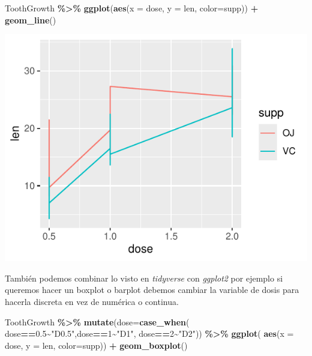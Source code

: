 \documentclass[
]{book}
\newenvironment{Shaded}{\begin{snugshade}}{\end{snugshade}}
\newcommand{\AttributeTok}[1]{\textcolor[rgb]{0.13,0.29,0.53}{#1}}
\newcommand{\DecValTok}[1]{\textcolor[rgb]{0.00,0.00,0.81}{#1}}
\newcommand{\FloatTok}[1]{\textcolor[rgb]{0.00,0.00,0.81}{#1}}
\newcommand{\FunctionTok}[1]{\textcolor[rgb]{0.13,0.29,0.53}{\textbf{#1}}}
\newcommand{\NormalTok}[1]{#1}
\newcommand{\SpecialCharTok}[1]{\textcolor[rgb]{0.81,0.36,0.00}{\textbf{#1}}}
\newcommand{\StringTok}[1]{\textcolor[rgb]{0.31,0.60,0.02}{#1}}
\begin{document}
\begin{Shaded}
\begin{Highlighting}[]
\NormalTok{ToothGrowth }\SpecialCharTok{\%\textgreater{}\%} \FunctionTok{ggplot}\NormalTok{(}\FunctionTok{aes}\NormalTok{(}\AttributeTok{x =}\NormalTok{ dose, }\AttributeTok{y =}\NormalTok{ len, }\AttributeTok{color=}\NormalTok{supp)) }\SpecialCharTok{+}
  \FunctionTok{geom\_line}\NormalTok{()}
\end{Highlighting}
\end{Shaded}

\begin{center}\includegraphics{_main_files/figure-latex/unnamed-chunk-207-1} \end{center}

También podemos combinar lo visto en \emph{tidyverse} con \emph{ggplot2} por ejemplo si queremos hacer un boxplot o barplot debemos cambiar la variable de dosis para hacerla discreta en vez de numérica o continua.

\begin{Shaded}
\begin{Highlighting}[]
\NormalTok{ToothGrowth }\SpecialCharTok{\%\textgreater{}\%}  \FunctionTok{mutate}\NormalTok{(}\AttributeTok{dose=}\FunctionTok{case\_when}\NormalTok{(}
\NormalTok{  dose}\SpecialCharTok{==}\FloatTok{0.5}\SpecialCharTok{\textasciitilde{}}\StringTok{"D0.5"}\NormalTok{,dose}\SpecialCharTok{==}\DecValTok{1}\SpecialCharTok{\textasciitilde{}}\StringTok{"D1"}\NormalTok{, dose}\SpecialCharTok{==}\DecValTok{2}\SpecialCharTok{\textasciitilde{}}\StringTok{"D2"}\NormalTok{)) }\SpecialCharTok{\%\textgreater{}\%} \FunctionTok{ggplot}\NormalTok{(}
    \FunctionTok{aes}\NormalTok{(}\AttributeTok{x =}\NormalTok{ dose, }\AttributeTok{y =}\NormalTok{ len, }\AttributeTok{color=}\NormalTok{supp)) }\SpecialCharTok{+}  \FunctionTok{geom\_boxplot}\NormalTok{()}
\end{Highlighting}
\end{Shaded}
\end{document}
